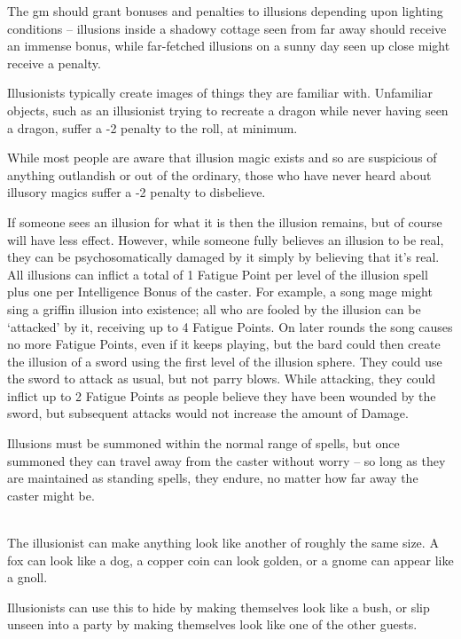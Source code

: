 \begin{multicols}{2}
The \gls{gm} should grant bonuses and penalties to illusions depending upon lighting conditions -- illusions inside a shadowy cottage seen from far away should receive an immense bonus, while far-fetched illusions on a sunny day seen up close might receive a penalty.

Illusionists typically create images of things they are familiar with. Unfamiliar objects, such as an illusionist trying to recreate a dragon while never having seen a dragon, suffer a -2 penalty to the roll, at minimum.

While most people are aware that illusion magic exists and so are suspicious of anything outlandish or out of the ordinary, those who have never heard about illusory magics suffer a -2 penalty to disbelieve.

If someone sees an illusion for what it is then the illusion remains, but of course will have less effect. However, while someone fully believes an illusion to be real, they can be psychosomatically damaged by it simply by believing that it's real. All illusions can inflict a total of 1 Fatigue Point per level of the illusion spell plus one per Intelligence Bonus of the caster. For example, a song mage might sing a griffin illusion into existence; all who are fooled by the illusion can be `attacked' by it, receiving up to 4 Fatigue Points. On later \glspl{round} the song causes no more Fatigue Points, even if it keeps playing, but the bard could then create the illusion of a sword using the first level of the illusion sphere. They could use the sword to attack as usual, but not parry blows. While attacking, they could inflict up to 2 Fatigue Points as people believe they have been wounded by the sword, but subsequent attacks would not increase the amount of Damage.

Illusions must be summoned within the normal range of spells, but once summoned they can travel away from the caster without worry -- so long as they are maintained as standing spells, they endure, no matter how far away the caster might be.

\spelllevel

\\
The illusionist can make anything look like another of roughly the same size.  A fox can look like a dog, a copper coin can look golden, or a gnome can appear like a gnoll.

Illusionists can use this to hide by making themselves look like a bush, or slip unseen into a party by making themselves look like one of the other guests.


\end{multicols}

